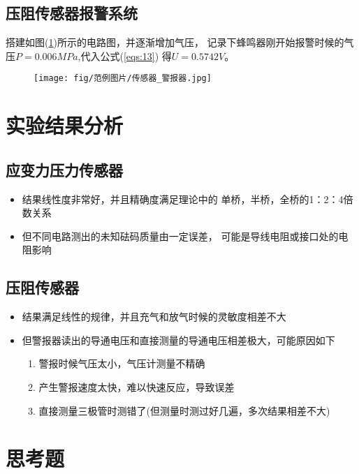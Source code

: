\documentclass[a4paper,UTF8]{ctexart}
\begin{document}
\subsection*{压阻传感器报警系统}
    搭建如图(\ref*{fig:13})所示的电路图，并逐渐增加气压，
记录下蜂鸣器刚开始报警时候的气压$P=0.006MPa$,代入公式(\ref*{eqs:13})
得$U=0.5742V$。
\begin{figure}[!hp]
    \centering
    \texttt{[image: fig/范例图片/传感器\_警报器.jpg]}
    \label{fig:13}
\end{figure}


\newpage
\section{实验结果分析}
\subsection*{应变力压力传感器}
\begin{itemize}
    \item 结果线性度非常好，并且精确度满足理论中的
            单桥，半桥，全桥的1：2：4倍数关系
    \item 但不同电路测出的未知砝码质量由一定误差，
            可能是导线电阻或接口处的电阻影响
\end{itemize}
\subsection*{压阻传感器}
    \begin{itemize}
        \item 结果满足线性的规律，并且充气和放气时候的灵敏度相差不大
        \item 但警报器读出的导通电压和直接测量的导通电压相差极大，可能原因如下
        \begin{enumerate}
            \item 警报时候气压太小，气压计测量不精确
            \item 产生警报速度太快，难以快速反应，导致误差
            \item 直接测量三极管时测错了(但测量时测过好几遍，多次结果相差不大)
        \end{enumerate}
    \end{itemize}

\section{思考题}
\end{document}
